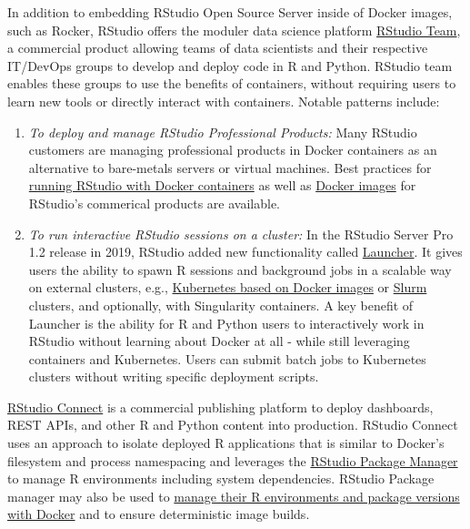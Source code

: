 In addition to embedding RStudio Open Source Server inside of Docker
images, such as Rocker, RStudio offers the moduler data science platform
\href{https://rstudio.com/products/team/}{RStudio Team}, a commercial
product allowing teams of data scientists and their respective IT/DevOps
groups to develop and deploy code in R and Python. RStudio team enables
these groups to use the benefits of containers, without requiring users
to learn new tools or directly interact with containers. Notable
patterns include:

\begin{enumerate}
\def\labelenumi{\arabic{enumi}.}
\tightlist
\item
  \emph{To deploy and manage RStudio Professional Products:} Many
  RStudio customers are managing professional products in Docker
  containers as an alternative to bare-metals servers or virtual
  machines. Best practices for
  \href{https://support.rstudio.com/hc/en-us/articles/360021594513-Running-RStudio-with-Docker-containers}{running
  RStudio with Docker containers} as well as
  \href{https://github.com/rstudio/rstudio-docker-products}{Docker
  images} for RStudio's commerical products are available.
\item
  \emph{To run interactive RStudio sessions on a cluster:} In the
  RStudio Server Pro 1.2 release in 2019, RStudio added new
  functionality called
  \href{https://solutions.rstudio.com/launcher/overview/}{Launcher}. It
  gives users the ability to spawn R sessions and background jobs in a
  scalable way on external clusters, e.g.,
  \href{https://support.rstudio.com/hc/en-us/articles/360019253393-Using-Docker-images-with-RStudio-Server-Pro-Launcher-and-Kubernetes}{Kubernetes
  based on Docker images} or \href{https://slurm.schedmd.com/}{Slurm}
  clusters, and optionally, with Singularity containers. A key benefit
  of Launcher is the ability for R and Python users to interactively
  work in RStudio without learning about Docker at all - while still
  leveraging containers and Kubernetes. Users can submit batch jobs to
  Kubernetes clusters without writing specific deployment scripts.
\end{enumerate}

\href{https://rstudio.com/products/connect/}{RStudio Connect} is a
commercial publishing platform to deploy dashboards, REST APIs, and
other R and Python content into production. RStudio Connect uses an
approach to isolate deployed R applications that is similar to Docker's
filesystem and process namespacing and leverages the
\href{https://rstudio.com/products/package-manager/}{RStudio Package
Manager} to manage R environments including system dependencies. RStudio
Package manager may also be used to
\href{https://environments.rstudio.com/docker}{manage their R
environments and package versions with Docker} and to ensure
deterministic image builds.

